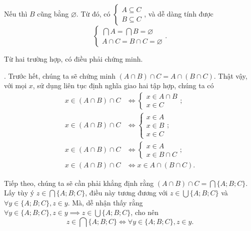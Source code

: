Nếu  thì $B$ cũng bằng $\varnothing$. Từ đó, có $\begin{cases}
   A \subseteq C \\
   B \subseteq C
\end{cases}$, và dễ dàng tính được
\begin{equation*}
   \begin{cases}
      \bigcap A = \bigcap B = \varnothing \\
      A \cap C = B \cap C = \varnothing
   \end{cases}.
\end{equation*}

Từ hai trường hợp, có điều phải chứng minh.
   
. Trước hết, chúng ta sẽ chứng minh $(A \cap B) \cap C = A \cap (B \cap C)$. Thật vậy, với mọi $x$, sử dụng liên tục định nghĩa giao hai tập hợp, chúng ta có
\begin{align*}
   x \in (A \cap B) \cap C &\iff \begin{cases}
      x \in A \cap B \\
      x \in C
   \end{cases}; \\
   x \in (A \cap B) \cap C &\iff \begin{cases}
      x \in A \\
      x \in B \\
      x \in C
   \end{cases}; \\
   x \in (A \cap B) \cap C &\iff \begin{cases}
      x \in A \\
      x \in B \cap C
   \end{cases}; \\
   x \in (A \cap B) \cap C &\iff x \in A \cap (B \cap C).
\end{align*}

Tiếp theo, chúng ta sẽ cần phải khẳng định rằng $(A \cap B) \cap C = \bigcap \{A; B; C\}$. Lấy tùy ý $z \in \bigcap\{A; B; C\}$, điều này tương đương với $z \in \bigcup \{A; B; C\}$ và $\forall y \in \{A; B; C\}, z \in y$. Mà, dễ nhận thấy rằng $\forall y \in \{A; B; C\}, z \in y \implies z \in \bigcup \{A; B; C\}$, cho nên
\begin{equation*}
   z \in \bigcap\{A; B; C\} \iff \forall y \in \{A; B; C\}, z \in y.
\end{equation*}

